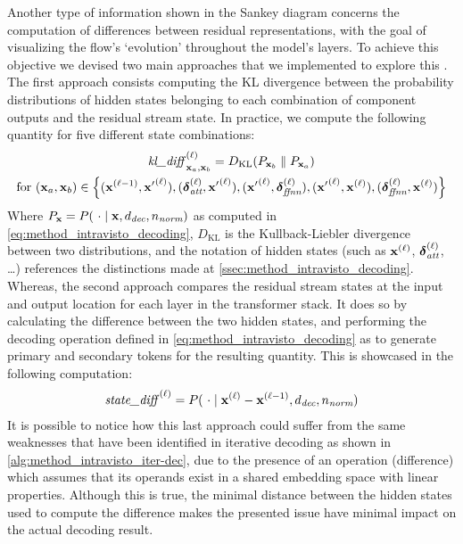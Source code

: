 Another type of information shown in the Sankey diagram concerns the computation of differences between residual representations, with the goal of visualizing the flow's `evolution' throughout the model's layers.
To achieve this objective we devised two main approaches that we implemented to explore this .
The first approach consists  computing the KL divergence between the probability distributions of hidden states belonging to each combination of component outputs and the residual stream state.
In practice, we compute the following quantity for five different state combinations:
\begin{equation}
    \label{eq:method_intravisto_kl-diff}
    \begin{gathered}
        {\textit{kl\_diff}{\,}\strut}_{\bm{\mathbf{x}}_a, \bm{\mathbf{x}}_b}^{(\ell)} = D_{\text{KL}}(P_{\bm{\mathbf{x}}_b} \parallel P_{\bm{\mathbf{x}}_a}) \\
        \text{for} \ (\bm{\mathbf{x}}_a, \bm{\mathbf{x}}_b) \in \Bigl\{
            (\bm{\mathbf{x}}^{(\ell-1)}, {\bm{\mathbf{x}}'}^{(\ell)}), 
            (\bm{\mathbf{\delta}}_\textit{att}^{(\ell)}, {\bm{\mathbf{x}}'}^{(\ell)}), 
            ({\bm{\mathbf{x}}'}^{(\ell)}, \bm{\mathbf{\delta}}_\textit{ffnn}^{(\ell)}), 
            ({\bm{\mathbf{x}}'}^{(\ell)}, \bm{\mathbf{x}}^{(\ell)}), 
            (\bm{\mathbf{\delta}}_\textit{ffnn}^{(\ell)}, \bm{\mathbf{x}}^{(\ell)})
        \Bigr\}
    \end{gathered}
\end{equation}
Where $P_{\bm{\mathbf{x}}} = P(\ \cdot \mid \bm{\mathbf{x}}, d_\textit{dec}, n_\textit{norm})$ as computed in \cref{eq:method_intravisto_decoding}, $D_{\text{KL}}$ is the Kullback-Liebler divergence between two distributions, and the notation of hidden states (such as $\bm{\mathbf{x}}^{(\ell)}$, $\bm{\mathbf{\delta}}_\textit{att}^{(\ell)}$, \ldots) references the distinctions made at \cref{ssec:method_intravisto_decoding}.
Whereas, the second approach compares the residual stream states at the input and output location for each layer in the transformer stack.
It does so by calculating the difference between the two hidden states, and performing the decoding operation defined in \cref{eq:method_intravisto_decoding} as to generate primary and secondary tokens for the resulting quantity.
This is showcased in the following computation:
\begin{equation}
    \label{eq:method_intravisto_state-diff}
    {\textit{state\_diff}{\,}\strut}^{(\ell)} = P(\ \cdot \mid \bm{\mathbf{x}}^{(\ell)} - \bm{\mathbf{x}}^{(\ell - 1)}, d_\textit{dec}, n_\textit{norm})
\end{equation}
It is possible to notice how this last approach could suffer from the same weaknesses that have been identified in iterative decoding as shown in \cref{alg:method_intravisto_iter-dec}, due to the presence of an operation (difference) which assumes that its operands exist in a shared embedding space with linear properties.
Although this is true, the minimal distance between the hidden states used to compute the difference makes the presented issue have minimal impact on the actual decoding result.

